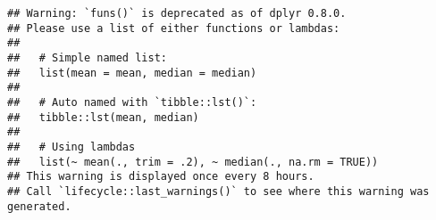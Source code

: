 \documentclass[
]{article}
\newenvironment{Shaded}{\begin{snugshade}}{\end{snugshade}}
\newcommand{\CharTok}[1]{\textcolor[rgb]{0.31,0.60,0.02}{#1}}
\newcommand{\CommentTok}[1]{\textcolor[rgb]{0.56,0.35,0.01}{\textit{#1}}}
\newcommand{\DataTypeTok}[1]{\textcolor[rgb]{0.13,0.29,0.53}{#1}}
\newcommand{\KeywordTok}[1]{\textcolor[rgb]{0.13,0.29,0.53}{\textbf{#1}}}
\newcommand{\NormalTok}[1]{#1}
\newcommand{\OperatorTok}[1]{\textcolor[rgb]{0.81,0.36,0.00}{\textbf{#1}}}
\newcommand{\StringTok}[1]{\textcolor[rgb]{0.31,0.60,0.02}{#1}}
\begin{document}
\begin{Shaded}
\end{Shaded}

\begin{verbatim}
## Warning: `funs()` is deprecated as of dplyr 0.8.0.
## Please use a list of either functions or lambdas: 
## 
##   # Simple named list: 
##   list(mean = mean, median = median)
## 
##   # Auto named with `tibble::lst()`: 
##   tibble::lst(mean, median)
## 
##   # Using lambdas
##   list(~ mean(., trim = .2), ~ median(., na.rm = TRUE))
## This warning is displayed once every 8 hours.
## Call `lifecycle::last_warnings()` to see where this warning was generated.
\end{verbatim}

\begin{Shaded}
\end{Shaded}
\end{document}
